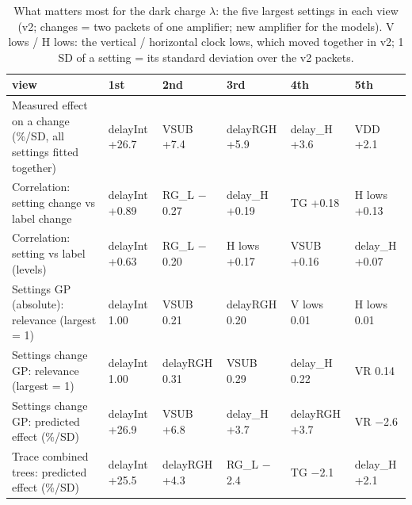 \begin{table}[H]\centering\small
\caption{What matters most for the dark charge $\lambda$: the five largest settings in each view (v2; changes = two packets of one amplifier; new amplifier for the models). V lows / H lows: the vertical / horizontal clock lows, which moved together in v2; 1 SD of a setting = its standard deviation over the v2 packets.}
\begin{tabular}{p{5.2cm}lllll}\toprule
view & 1st & 2nd & 3rd & 4th & 5th\\\midrule
Measured effect on a change (\%/SD, all settings fitted together) & delayInt +26.7 & VSUB +7.4 & delayRGH +5.9 & delay\_H +3.6 & VDD +2.1\\
Correlation: setting change vs label change & delayInt +0.89 & RG\_L $-$0.27 & delay\_H +0.19 & TG +0.18 & H lows +0.13\\
Correlation: setting vs label (levels) & delayInt +0.63 & RG\_L $-$0.20 & H lows +0.17 & VSUB +0.16 & delay\_H +0.07\\
Settings GP (absolute): relevance (largest = 1) & delayInt 1.00 & VSUB 0.21 & delayRGH 0.20 & V lows 0.01 & H lows 0.01\\
Settings change GP: relevance (largest = 1) & delayInt 1.00 & delayRGH 0.31 & VSUB 0.29 & delay\_H 0.22 & VR 0.14\\
Settings change GP: predicted effect (\%/SD) & delayInt +26.9 & VSUB +6.8 & delay\_H +3.7 & delayRGH +3.7 & VR $-$2.6\\
Trace combined trees: predicted effect (\%/SD) & delayInt +25.5 & delayRGH +4.3 & RG\_L $-$2.4 & TG $-$2.1 & delay\_H +2.1\\
\bottomrule\end{tabular}\end{table}

